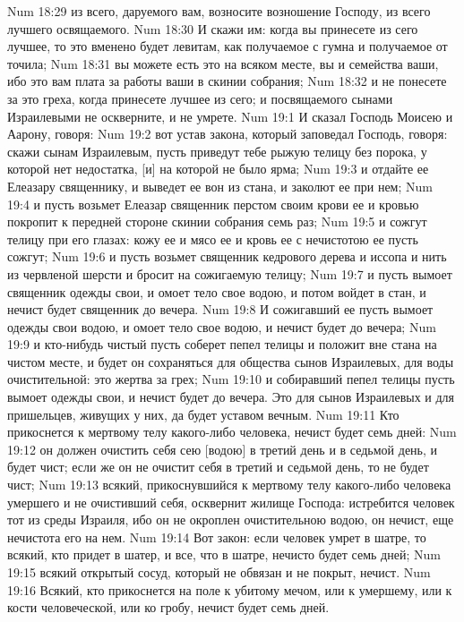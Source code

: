 Num 18:29  из всего, даруемого вам, возносите возношение Господу, из всего лучшего освящаемого.
Num 18:30  И скажи им: когда вы принесете из сего лучшее, то это вменено будет левитам, как получаемое с гумна и получаемое от точила;
Num 18:31  вы можете есть это на всяком месте, вы и семейства ваши, ибо это вам плата за работы ваши в скинии собрания;
Num 18:32  и не понесете за это греха, когда принесете лучшее из сего; и посвящаемого сынами Израилевыми не оскверните, и не умрете.
Num 19:1  И сказал Господь Моисею и Аарону, говоря:
Num 19:2  вот устав закона, который заповедал Господь, говоря: скажи сынам Израилевым, пусть приведут тебе рыжую телицу без порока, у которой нет недостатка, [и] на которой не было ярма;
Num 19:3  и отдайте ее Елеазару священнику, и выведет ее вон из стана, и заколют ее при нем;
Num 19:4  и пусть возьмет Елеазар священник перстом своим крови ее и кровью покропит к передней стороне скинии собрания семь раз;
Num 19:5  и сожгут телицу при его глазах: кожу ее и мясо ее и кровь ее с нечистотою ее пусть сожгут;
Num 19:6  и пусть возьмет священник кедрового дерева и иссопа и нить из червленой шерсти и бросит на сожигаемую телицу;
Num 19:7  и пусть вымоет священник одежды свои, и омоет тело свое водою, и потом войдет в стан, и нечист будет священник до вечера.
Num 19:8  И сожигавший ее пусть вымоет одежды свои водою, и омоет тело свое водою, и нечист будет до вечера;
Num 19:9  и кто-нибудь чистый пусть соберет пепел телицы и положит вне стана на чистом месте, и будет он сохраняться для общества сынов Израилевых, для воды очистительной: это жертва за грех;
Num 19:10  и собиравший пепел телицы пусть вымоет одежды свои, и нечист будет до вечера. Это для сынов Израилевых и для пришельцев, живущих у них, да будет уставом вечным.
Num 19:11  Кто прикоснется к мертвому телу какого-либо человека, нечист будет семь дней:
Num 19:12  он должен очистить себя сею [водою] в третий день и в седьмой день, и будет чист; если же он не очистит себя в третий и седьмой день, то не будет чист;
Num 19:13  всякий, прикоснувшийся к мертвому телу какого-либо человека умершего и не очистивший себя, осквернит жилище Господа: истребится человек тот из среды Израиля, ибо он не окроплен очистительною водою, он нечист, еще нечистота его на нем.
Num 19:14  Вот закон: если человек умрет в шатре, то всякий, кто придет в шатер, и все, что в шатре, нечисто будет семь дней;
Num 19:15  всякий открытый сосуд, который не обвязан и не покрыт, нечист.
Num 19:16  Всякий, кто прикоснется на поле к убитому мечом, или к умершему, или к кости человеческой, или ко гробу, нечист будет семь дней.
